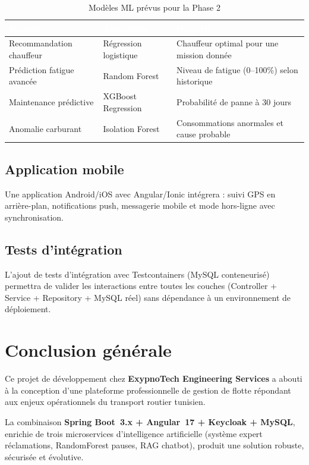 \documentclass[12pt,a4paper]{report}
\newcommand{\thead}[1]{\cellcolor{tablehead}\textcolor{white}{\textbf{#1}}}
\begin{document}
\begin{table}[H]
  \centering
  \caption{Modèles ML prévus pour la Phase 2}
  \label{tab:ml_phase2}
  \begin{tabularx}{\textwidth}{|l|l|Y|}
    \hline
    \thead{Module} & \thead{Algorithme} & \thead{Objectif} \\
    \hline
    Recommandation chauffeur & Régression logistique &
      Chauffeur optimal pour une mission donnée \\
    Prédiction fatigue avancée & Random Forest &
      Niveau de fatigue (0--100\%) selon historique \\
    Maintenance prédictive & XGBoost Regression &
      Probabilité de panne à 30 jours \\
    Anomalie carburant & Isolation Forest &
      Consommations anormales et cause probable \\
    \hline
  \end{tabularx}
\end{table}

\subsection{Application mobile}

Une application Android/iOS avec Angular/Ionic intégrera :
suivi GPS en arrière-plan, notifications push, messagerie mobile
et mode hors-ligne avec synchronisation.

\subsection{Tests d'intégration}

L'ajout de tests d'intégration avec Testcontainers (MySQL conteneurisé)
permettra de valider les interactions entre toutes les couches
(Controller + Service + Repository + MySQL réel) sans dépendance
à un environnement de déploiement.

\section{Conclusion générale}
\label{sec:ch10-conclusion}

Ce projet de développement chez \textbf{ExypnoTech Engineering Services}
a abouti à la conception d'une plateforme professionnelle de gestion de flotte
répondant aux enjeux opérationnels du transport routier tunisien.

La combinaison \textbf{Spring Boot~3.x + Angular~17 + Keycloak + MySQL},
enrichie de trois microservices d'intelligence artificielle
(système expert réclamations, RandomForest pauses, RAG chatbot),
produit une solution robuste, sécurisée et évolutive.
\end{document}
